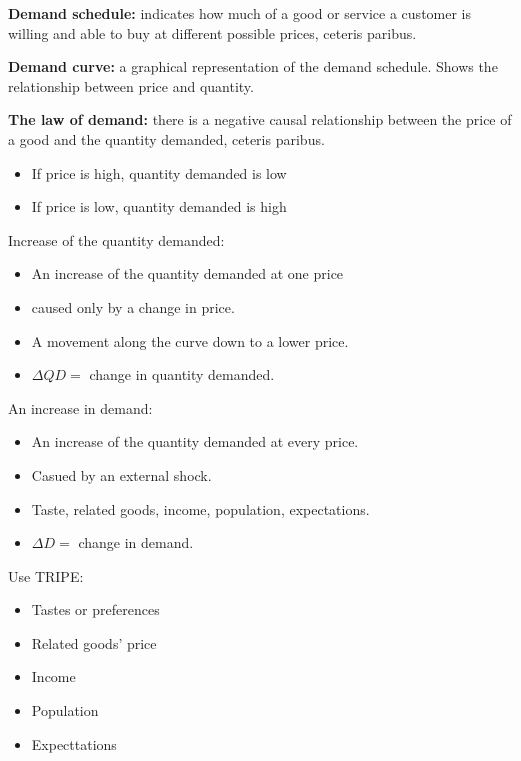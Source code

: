 \documentclass{scrreprt} %
\begin{document}
\begin{definition}
	\textbf{Demand schedule:} indicates how much of a good or service a customer
	is willing and able to buy at different possible prices, ceteris paribus.

	\textbf{Demand curve:} a graphical representation of the demand schedule. Shows the
	relationship between price and quantity.

	\textbf{The law of demand:} there is a negative causal relationship between the price
	of a good and the quantity demanded, ceteris paribus.
	\begin{itemize}
		\item If price is high, quantity demanded is low
		\item If price is low, quantity demanded is high
	\end{itemize}
\end{definition}

Increase of the quantity demanded:

\begin{itemize}
	\item An increase of the quantity demanded at one price
	\item caused only by a change in price.
	\item A movement along the curve down to a lower price.
	\item $\Delta QD =$ change in quantity demanded.
\end{itemize}

An increase in demand:

\begin{itemize}
	\item An increase of the quantity demanded at every price.
	\item Casued by an external shock.
	\item Taste, related goods, income, population, expectations.
	\item $\Delta D =$ change in demand.
\end{itemize}

Use TRIPE:

\begin{itemize}
	\item Tastes or preferences
	\item Related goods' price
	\item Income
	\item Population
	\item Expecttations
\end{itemize}
\end{document}
